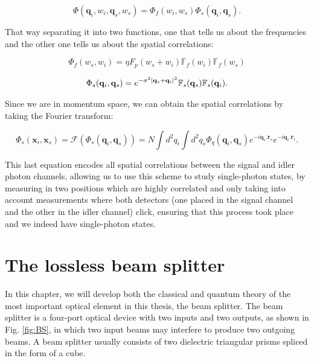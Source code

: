 \documentclass[12pt]{book}
\begin{document}
\begin{equation}
\Phi(\mathbf{q}_{i},w_{i},\mathbf{q}_{s},w_{s})=\Phi_{f}(w_{i},w_{s})\Phi_{s}(\mathbf{q}_{i},\mathbf{q}_{s}).
\end{equation}

That way separating it into two functions, one that tells us about the frequencies  and the other one tells us about the spatial correlations:

\begin{equation}
\Phi_{f}(w_{s},w_{i})= \eta F_{p}(w_{s}+w_{i}) \mathbb{F}_{f}(w_{i})\mathbb{F}_{f}(w_{s})
\end{equation}

\begin{equation}
 \Phi_{s}(\mathbf{q}_{i},\mathbf{q}_{s})=e^{-\sigma^{2}\abs{\mathbf{q}_{s}+\mathbf{q}_{i}}^{2}}\mathbb{F}_{s}(\mathbf{q}_{s})\mathbb{F}_{s}(\mathbf{q}_{i}).
\end{equation}

Since we are in momentum space, we can obtain the spatial correlations by taking the Fourier transform:

\begin{equation}
\Phi_{s}(\mathbf{x}_{i},\mathbf{x}_{s})=\mathscr{F}(\Phi_{s}(\mathbf{q}_{i},\mathbf{q}_{s}))=N \int d^{2}q_{i} \int d^{2}q_{s} \Phi_{q}(\mathbf{q}_{i},\mathbf{q}_{s}) e^{-i \mathbf{q}_{s}.\mathbf{r}_{s}} e^{-i \mathbf{q}_{i}.\mathbf{r}_{i}}.
\end{equation}




This last equation encodes all spatial correlations between the signal and idler photon channels, allowing us to use this scheme to study single-photon states, by measuring in two positions which are highly correlated and only taking into account measurements where both detectors (one placed in the signal channel and the other in the idler channel) click, ensuring that this process took place and we indeed have single-photon states.


\chapter{The lossless beam splitter}


In this chapter, we will develop both the classical and quantum theory of the most important optical element in this thesis, the beam splitter. The beam splitter is a four-port optical device with two inputs and two outputs, as shown in Fig. \ref{fig:BS}, in which two input beams may interfere to produce two outgoing beams. A beam splitter usually consists of two dielectric triangular prisms spliced in the form of a cube.
\end{document}
